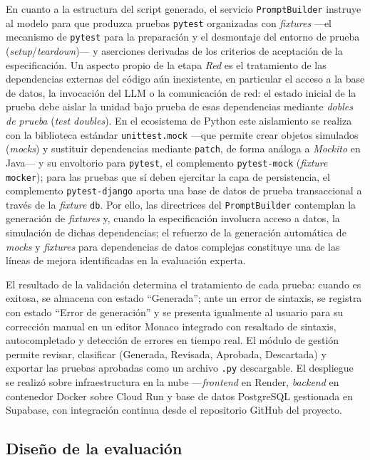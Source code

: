 \documentclass[10pt,journal,twoside,letterpaper]{IEEEtran}
\begin{document}
    En cuanto a la estructura del script generado, el servicio \texttt{PromptBuilder} instruye al modelo para que produzca pruebas \texttt{pytest} organizadas con \emph{fixtures} ---el mecanismo de \texttt{pytest} para la preparación y el desmontaje del entorno de prueba (\emph{setup}/\emph{teardown})--- y aserciones derivadas de los criterios de aceptación de la especificación. Un aspecto propio de la etapa \emph{Red} es el tratamiento de las dependencias externas del código aún inexistente, en particular el acceso a la base de datos, la invocación del LLM o la comunicación de red: el estado inicial de la prueba debe aislar la unidad bajo prueba de esas dependencias mediante \emph{dobles de prueba} (\emph{test doubles}). En el ecosistema de Python este aislamiento se realiza con la biblioteca estándar \texttt{unittest.mock} ---que permite crear objetos simulados (\emph{mocks}) y sustituir dependencias mediante \texttt{patch}, de forma análoga a \emph{Mockito} en Java--- y su envoltorio para \texttt{pytest}, el complemento \texttt{pytest-mock} (\emph{fixture} \texttt{mocker}); para las pruebas que sí deben ejercitar la capa de persistencia, el complemento \texttt{pytest-django} aporta una base de datos de prueba transaccional a través de la \emph{fixture} \texttt{db}. Por ello, las directrices del \texttt{PromptBuilder} contemplan la generación de \emph{fixtures} y, cuando la especificación involucra acceso a datos, la simulación de dichas dependencias; el refuerzo de la generación automática de \emph{mocks} y \emph{fixtures} para dependencias de datos complejas constituye una de las líneas de mejora identificadas en la evaluación experta.
    
    El resultado de la validación determina el tratamiento de cada prueba: cuando es exitosa, se almacena con estado ``Generada''; ante un error de sintaxis, se registra con estado ``Error de generación'' y se presenta igualmente al usuario para su corrección manual en un editor Monaco integrado con resaltado de sintaxis, autocompletado y detección de errores en tiempo real. El módulo de gestión permite revisar, clasificar (Generada, Revisada, Aprobada, Descartada) y exportar las pruebas aprobadas como un archivo \texttt{.py} descargable. El despliegue se realizó sobre infraestructura en la nube ---\emph{frontend} en Render, \emph{backend} en contenedor Docker sobre Cloud Run y base de datos PostgreSQL gestionada en Supabase, con integración continua desde el repositorio GitHub del proyecto.
    
    \subsection{Diseño de la evaluación}
    \label{subsec:validacion}
    
\end{document}
